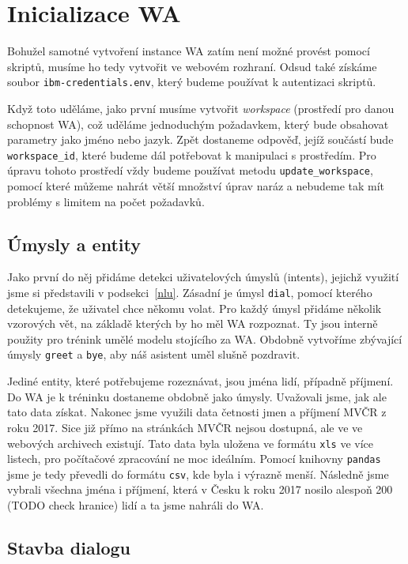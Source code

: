 \section{Inicializace WA}\label{wainit}

Bohužel samotné vytvoření instance WA zatím není možné provést pomocí skriptů,
musíme ho tedy vytvořit ve webovém rozhraní. Odsud také získáme soubor
\texttt{ibm-credentials.env}, který budeme používat k autentizaci skriptů.

Když toto uděláme, jako první musíme vytvořit \textit{workspace}
(prostředí pro danou schopnost WA), což uděláme
jednoduchým požadavkem, který bude obsahovat parametry jako jméno nebo jazyk.
Zpět dostaneme odpověď, jejíž součástí bude \texttt{workspace\_id}, které budeme
dál potřebovat k manipulaci s prostředím. Pro úpravu tohoto prostředí
vždy budeme používat metodu \texttt{update\_workspace}, pomocí které můžeme
nahrát větší množství úprav naráz a nebudeme tak mít problémy s limitem na
počet požadavků.

\subsection{Úmysly a entity}

Jako první do něj přidáme detekci uživatelových úmyslů (intents), jejichž využití
jsme si představili v podsekci~\ref{nlu}. Zásadní je úmysl
\texttt{dial}, pomocí kterého detekujeme, že uživatel chce někomu volat. Pro
každý úmysl přidáme několik vzorových vět, na základě kterých by ho měl WA
rozpoznat. Ty jsou interně použity pro trénink umělé modelu stojícího za WA.
Obdobně vytvoříme zbývající úmysly \texttt{greet} a \texttt{bye}, aby náš
asistent uměl slušně pozdravit.

Jediné entity, které potřebujeme rozeznávat, jsou jména lidí, případně příjmení.
Do WA je k tréninku dostaneme obdobně jako úmysly. Uvažovali jsme, jak ale tato
data získat. Nakonec jsme využili data četnosti jmen a příjmení MVČR z roku 2017.
Sice již přímo na stránkách MVČR nejsou dostupná, ale ve ve webových archivech
existují. Tato data byla uložena ve formátu \texttt{xls} ve více listech, pro
počítačové zpracování ne moc ideálním. Pomocí knihovny \texttt{pandas} jsme je
tedy převedli do formátu \texttt{csv}, kde byla i výrazně menší. Následně jsme
vybrali všechna jména i příjmení, která v Česku k roku 2017 nosilo alespoň
200 (TODO check hranice) lidí a ta jsme nahráli do WA.

\subsection{Stavba dialogu}

